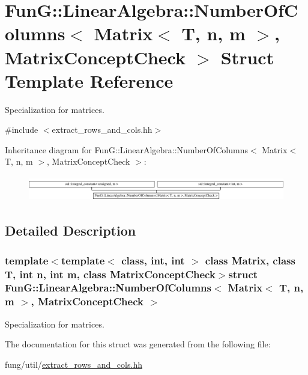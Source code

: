 \hypertarget{structFunG_1_1LinearAlgebra_1_1NumberOfColumns_3_01Matrix_3_01T_00_01n_00_01m_01_4_00_01MatrixConceptCheck_01_4}{\section{\-Fun\-G\-:\-:\-Linear\-Algebra\-:\-:\-Number\-Of\-Columns$<$ \-Matrix$<$ \-T, n, m $>$, \-Matrix\-Concept\-Check $>$ \-Struct \-Template \-Reference}
\label{structFunG_1_1LinearAlgebra_1_1NumberOfColumns_3_01Matrix_3_01T_00_01n_00_01m_01_4_00_01MatrixConceptCheck_01_4}
}


\-Specialization for matrices.  




{\ttfamily \#include $<$extract\-\_\-rows\-\_\-and\-\_\-cols.\-hh$>$}

\-Inheritance diagram for \-Fun\-G\-:\-:\-Linear\-Algebra\-:\-:\-Number\-Of\-Columns$<$ \-Matrix$<$ \-T, n, m $>$, \-Matrix\-Concept\-Check $>$\-:\begin{figure}[H]
\begin{center}
\leavevmode
\includegraphics[height=1.117764cm]{structFunG_1_1LinearAlgebra_1_1NumberOfColumns_3_01Matrix_3_01T_00_01n_00_01m_01_4_00_01MatrixConceptCheck_01_4}
\end{center}
\end{figure}


\subsection{\-Detailed \-Description}
\subsubsection*{template$<$template$<$ class, int, int $>$ class \-Matrix, class T, int n, int m, class Matrix\-Concept\-Check$>$struct Fun\-G\-::\-Linear\-Algebra\-::\-Number\-Of\-Columns$<$ Matrix$<$ T, n, m $>$, Matrix\-Concept\-Check $>$}

\-Specialization for matrices. 

\-The documentation for this struct was generated from the following file\-:\begin{DoxyCompactItemize}
\item 
fung/util/\hyperlink{extract__rows__and__cols_8hh}{extract\-\_\-rows\-\_\-and\-\_\-cols.\-hh}\end{DoxyCompactItemize}
